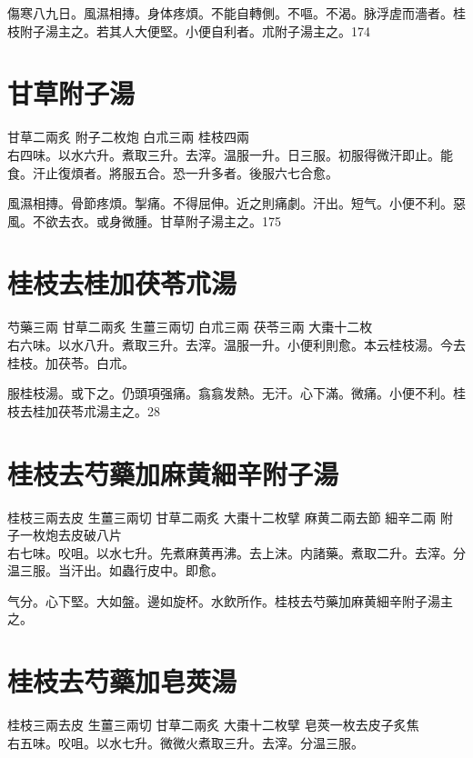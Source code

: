 \documentclass[b5paper,twoside,zihao=-4,UTF8]{ctexbook}
\begin{document}
傷寒八九日。風濕相摶。身体疼煩。不能自轉側。不嘔。不渴。脉浮虗而濇者。桂枝附子湯主之。若其人大便堅。小便自利者。朮附子湯主之。174

\section{甘草附子湯}

甘草{\scriptsize 二兩炙} 附子{\scriptsize 二枚炮} 白朮{\scriptsize 三兩} 桂枝{\scriptsize 四兩}\\ 
右四味。以水六升。煮取三升。去滓。温服一升。日三服。初服得微汗即止。能食。汗止復煩者。將服五合。恐一升多者。後服六七合愈。

風濕相摶。骨節疼煩。掣痛。不得屈伸。近之則痛劇。汗出。短气。小便不利。惡風。不欲去衣。或身微腫。甘草附子湯主之。175

\section{桂枝去桂加茯苓朮湯}

芍藥{\scriptsize 三兩} 甘草{\scriptsize 二兩炙} 生薑{\scriptsize 三兩切} 白朮{\scriptsize 三兩} 茯苓{\scriptsize 三兩} 大棗{\scriptsize 十二枚}\\
右六味。以水八升。煮取三升。去滓。温服一升。小便利則愈。本云桂枝湯。今去桂枝。加茯苓。白朮。

服桂枝湯。{或}下之。仍頭項强痛。翕翕发熱。无汗。心下滿。微痛。小便不利。桂枝去桂加茯苓朮湯主之。28

\section{桂枝去芍藥加麻黄細辛附子湯}

桂枝{\scriptsize 三兩去皮} 生薑{\scriptsize 三兩切} 甘草{\scriptsize 二兩炙} 大棗{\scriptsize 十二枚擘} 麻黄{\scriptsize 二兩去節} 細辛{\scriptsize 二兩} 附子{\scriptsize 一枚炮去皮破八片}\\
右七味。㕮咀。以水七升。先煮麻黄再沸。去上沫。内諸藥。煮取二升。去滓。分温三服。当汗出。如蟲行皮中。即愈。

气分。心下堅。大如盤。邊如旋杯。水飲所作。桂枝去芍藥加麻黄細辛附子湯主之。

\section{桂枝去芍藥加皂莢湯}

桂枝{\scriptsize 三兩去皮} 生薑{\scriptsize 三兩切} 甘草{\scriptsize 二兩炙} 大棗{\scriptsize 十二枚擘} 皂莢{\scriptsize 一枚去皮子炙焦}\\
右五味。㕮咀。以水七升。微微火煮取三升。去滓。分温三服。
\end{document}
